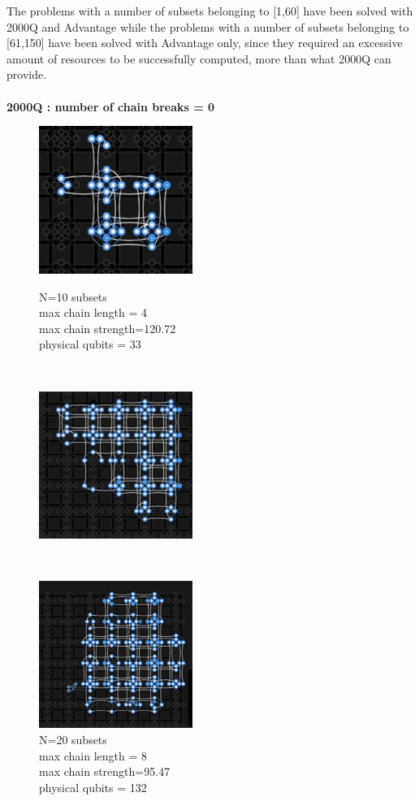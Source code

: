 \documentclass[oneside,a4paper]{article}
\begin{document}
The problems with a number of subsets belonging to [1,60] have been solved with 2000Q and Advantage while the problems with a number of subsets belonging to [61,150] have been solved with Advantage only, since they required an excessive amount of resources to be successfully computed, more than what 2000Q can provide.\\
\\
\textbf{2000Q : number of chain breaks = 0}
\begin{figure}[htp]
\begin{minipage}[b]{4.5cm}
\includegraphics[width=5cm]{LaTeXTemplate/Images/2000QN10.png}
\caption{N=10 subsets\\max chain length = 4\\max chain strength=120.72\\physical qubits = 33}
\end{minipage}
\ \hspace{2mm} \hspace{2mm} \
\begin{minipage}[b]{4.5cm}
\includegraphics[width=5cm]{LaTeXTemplate/Images/2000QN20.png}
\caption{N=20 subsets\\max chain length = 8\\max chain strength=95.47\\physical qubits = 132}
\end{minipage}
\ \hspace{2mm} \hspace{2mm} \
\begin{minipage}[b]{4.5cm}
\centering
\includegraphics[width=5cm]{LaTeXTemplate/Images/2000QN30.png}

\end{minipage}
\end{figure}
\end{document}
